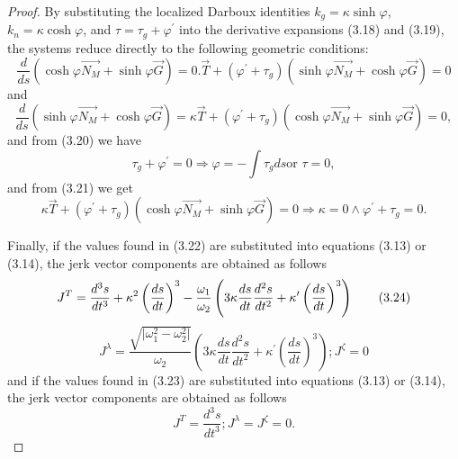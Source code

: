 \documentclass[reqno]{amsart}
\theoremstyle{plain}
\numberwithin{equation}{section}
\begin{document}
\begin{proof}
By substituting the localized Darboux identities $k_{g} = \kappa \sinh \varphi$, $k_{n} = \kappa \cosh \varphi$, and $\tau = \tau_{g} + \varphi^{\prime}$ into the derivative expansions (3.18) and (3.19), the systems reduce directly to the following geometric conditions:
\begin{equation}
\frac{d}{ds}\left( \cosh \varphi \overrightarrow{N_{M}}+\sinh \varphi 
\overrightarrow{G}\right) =0.\overrightarrow{T}+(\varphi ^{\prime }+\tau
_{g})\left( \sinh \varphi \overrightarrow{N_{M}}+\cosh \varphi 
\overrightarrow{G}\right) =0  \tag{3.20}
\end{equation}%
and 
\begin{equation}
\frac{d}{ds}\left( \sinh \varphi \overrightarrow{N_{M}}+\cosh \varphi 
\overrightarrow{G}\right) =\kappa \overrightarrow{T}+(\varphi ^{\prime
}+\tau _{g})\left( \cosh \varphi \overrightarrow{N_{M}}+\sinh \varphi 
\overrightarrow{G}\right) =0,  \tag{3.21}
\end{equation}%
and from (3.20) we have 
\begin{equation}
\tau _{g}+\varphi ^{\prime }=0\Rightarrow \varphi =-\int \tau _{g}ds\text{
or }\tau =0,  \tag{3.22}
\end{equation}%
and from (3.21) we get 
\begin{equation}
\kappa \overrightarrow{T}+(\varphi ^{\prime }+\tau _{g})\left( \cosh \varphi 
\overrightarrow{N_{M}}+\sinh \varphi \overrightarrow{G}\right) =0\Rightarrow
\kappa =0\wedge \varphi ^{\prime }+\tau _{g}=0.  \tag{3.23}
\end{equation}

Finally, if the values found in (3.22) are substituted into equations (3.13)
or (3.14), the jerk vector components are obtained as follows%
\begin{equation}
J^{T}=\frac{d^{3}s}{dt^{3}}+\kappa ^{2}\left( \frac{ds}{dt}\right) ^{3}-%
\frac{\omega _{1}}{\omega _{2}}\left( 3\kappa \frac{ds}{dt}\frac{d^{2}s}{%
dt^{2}}+\kappa ^{\prime }\left( \frac{ds}{dt}\right) ^{3}\right)  \tag{3.24}
\end{equation}%
\begin{equation}
J^{\lambda }=\frac{\sqrt{\vert\omega _{1}^{2}-\omega _{2}^{2}\vert}}{\omega _{2}}%
(3\kappa \frac{ds}{dt}\frac{d^{2}s}{dt^{2}}+\kappa ^{\prime }\left( \frac{ds%
}{dt}\right) ^{3});J^{\zeta }=0  \tag{3.25}
\end{equation}%
and if the values {}{}found in (3.23) are substituted into equations (3.13)
or (3.14), the jerk vector components are obtained as follows%
\begin{equation}
J^{T}=\frac{d^{3}s}{dt^{3}};J^{\lambda }=J^{\zeta }=0.  \tag{3.26}
\end{equation}


\end{proof}
\end{document}
